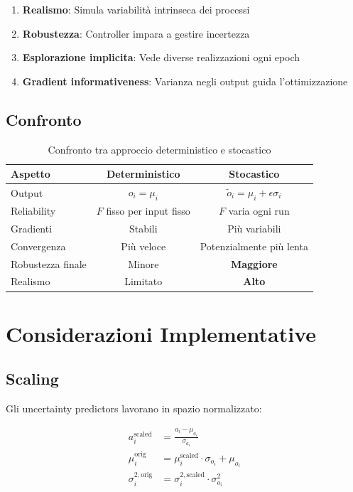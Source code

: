 \documentclass[11pt,a4paper]{article}
\begin{document}
\begin{enumerate}
    \item \textbf{Realismo}: Simula variabilità intrinseca dei processi
    \item \textbf{Robustezza}: Controller impara a gestire incertezza
    \item \textbf{Esplorazione implicita}: Vede diverse realizzazioni ogni epoch
    \item \textbf{Gradient informativeness}: Varianza negli output guida l'ottimizzazione
\end{enumerate}

\subsection{Confronto}

\begin{table}[h]
\centering
\begin{tabular}{lcc}
\toprule
\textbf{Aspetto} & \textbf{Deterministico} & \textbf{Stocastico} \\
\midrule
Output & $o_i = \mu_i$ & $\tilde{o}_i = \mu_i + \epsilon \sigma_i$ \\
Reliability & $F$ fisso per input fisso & $F$ varia ogni run \\
Gradienti & Stabili & Più variabili \\
Convergenza & Più veloce & Potenzialmente più lenta \\
Robustezza finale & Minore & \textbf{Maggiore} \\
Realismo & Limitato & \textbf{Alto} \\
\bottomrule
\end{tabular}
\caption{Confronto tra approccio deterministico e stocastico}
\end{table}

\section{Considerazioni Implementative}

\subsection{Scaling}

Gli uncertainty predictors lavorano in spazio normalizzato:

\begin{equation}
\begin{aligned}
a_i^{\text{scaled}} &= \frac{a_i - \mu_{a_i}}{\sigma_{a_i}} \\
\mu_i^{\text{orig}} &= \mu_i^{\text{scaled}} \cdot \sigma_{o_i} + \mu_{o_i} \\
\sigma_i^{2,\text{orig}} &= \sigma_i^{2,\text{scaled}} \cdot \sigma_{o_i}^2
\end{aligned}
\end{equation}
\end{document}
